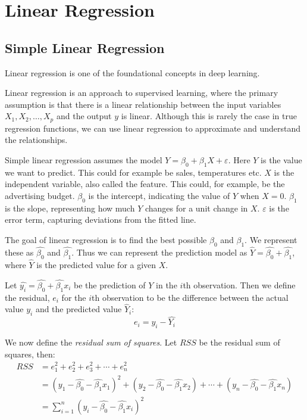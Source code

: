 \chapter{Linear Regression}

\section{Simple Linear Regression}%
\label{sec:label}



Linear regression is one of the foundational concepts in deep learning.

Linear regression is an approach to supervised learning, where the primary assumption is that there is a linear relationship between the input variables $X_{1}, X_{2}, \ldots, X_{p}$ and the output $y$ is linear. Although this is rarely the case in true regression functions, we can use linear regression to approximate and understand the relationships.

Simple linear regression assumes the model $Y = \beta_{0} + \beta_{1}X + \varepsilon$. Here $Y$ is the value we want to predict. This could for example be sales, temperatures etc. $X$ is the independent variable, also called the feature. This could, for example, be the advertising budget. \(\beta_{0}\) is the intercept, indicating the value of $Y$ when $X = 0$. \(\beta_{1}\) is the slope, representing how much $Y$ changes for a unit change in $X$. \(\varepsilon\) is the error term, capturing deviations from the fitted line.

The goal of linear regression is to find the best possible \(\beta_{0}\) and \(\beta_{1}\). We represent these as \(\hat{\beta_{0}}\) and $\hat{\beta_{1}}$. Thus we can represent the prediction model as $\hat{Y} = \hat{\beta_{0}} + \hat{\beta_{1}}$, where $\hat{Y}$ is the predicted value for a given $X$.

Let $\hat{y_{i}} = \hat{\beta_{0}} + \hat{\beta_{1}}x_{i}$ be the prediction of $Y$ in the $i$th observation. Then we define the residual, $e_{i}$ for the $i$th observation to be the difference between the actual value $y_{i}$ and the predicted value $\hat{Y}_{i}$:
\[
	e_{i} = y_{i} - \hat{Y_{i}}
\]

We now define the \textit{residual sum of squares}. Let $RSS$ be the residual sum of squares, then:
\begin{equation}
	\label{eq:rss}
	\begin{split}
		RSS & = e_{1}^{2}+e_{2}^{2}+e_{3}^{2}+ \cdots + e_{n}^{2}                                                                                                                                                          \\
		& = \left( y_{1} - \hat{\beta_{0}} - \hat{\beta_{1}}x_{1} \right)^{2} + \left( y_{2}- \hat{\beta_{0}}- \hat{\beta_{1}}x_{2} \right ) + \cdots + \left( y_{n} - \hat{\beta_{0}} - \hat{\beta_{1}} x_{n} \right) \\
		& = \sum_{i=1}^n (y_{i} - \hat{\beta_{0}} - \hat{\beta_{1}}x_{i})^{2}
	\end{split}
\end{equation}


